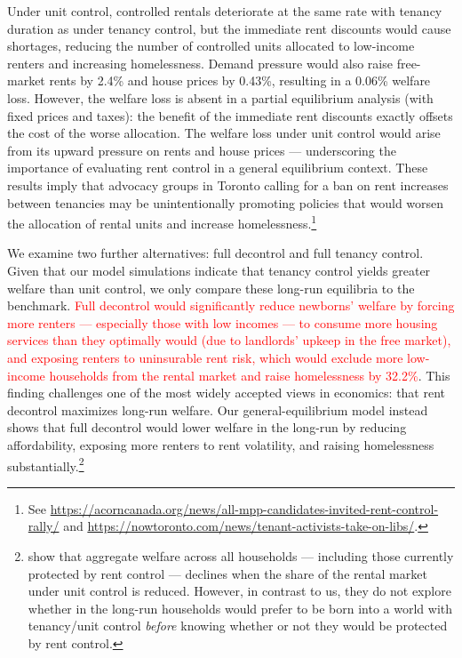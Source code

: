 \documentclass[parskip=full]{article}
\begin{document}
Under unit control, controlled rentals deteriorate at the same rate with tenancy duration as under tenancy control, but the immediate rent discounts would cause shortages, reducing the number of controlled units allocated to low-income renters and increasing homelessness. Demand pressure would also raise free-market rents by 2.4\% and house prices by 0.43\%, resulting in a 0.06\% welfare loss. However, the welfare loss is absent in a partial equilibrium analysis (with fixed prices and taxes): the benefit of the immediate rent discounts exactly offsets the cost of the worse allocation. The welfare loss under unit control would arise from its upward pressure on rents and house prices — underscoring the importance of evaluating rent control in a general equilibrium context. These results imply that advocacy groups in Toronto calling for a ban on rent increases between tenancies may be unintentionally promoting policies that would worsen the allocation of rental units and increase homelessness.\footnote{See \url{https://acorncanada.org/news/all-mpp-candidates-invited-rent-control-rally/} and \url{https://nowtoronto.com/news/tenant-activists-take-on-libs/}.}

We examine two further alternatives: full decontrol and full tenancy control. Given that our model simulations indicate that tenancy control yields greater welfare than unit control, we only compare these long-run equilibria to the benchmark. \textcolor{red}{Full decontrol would significantly reduce newborns' welfare by forcing more renters — especially those with low incomes — to consume more housing services than they optimally would (due to landlords' upkeep in the free market), and exposing renters to uninsurable rent risk, which would exclude more low-income households from the rental market and raise homelessness by 32.2\%}. This finding challenges one of the most widely accepted views in economics: that rent decontrol maximizes long-run welfare. Our general-equilibrium model instead shows that full decontrol would lower welfare in the long-run by reducing affordability, exposing more renters to rent volatility, and raising homelessness substantially.\footnote{\citet{fmn-2023} show that aggregate welfare across all households — including those currently protected by rent control — declines when the share of the rental market under unit control is reduced. However, in contrast to us, they do not explore whether in the long-run households would prefer to be born into a world with tenancy/unit control \textsl{before} knowing whether or not they would be protected by rent control.}
\end{document}
